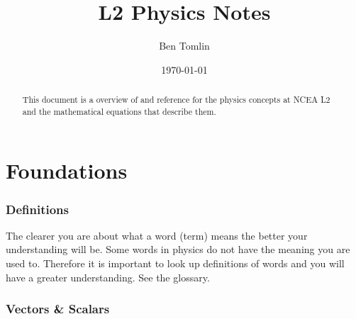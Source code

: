\documentclass[11pt,a4paper]{article}
\date{\today}
\title{L2 Physics Notes}
\author{Ben Tomlin}
\begin{document}
\maketitle

\begin{abstract}
This document is a overview of and reference for the physics concepts at NCEA L2 and the mathematical equations that describe them. 
\end{abstract}


\tableofcontents

\part{Foundations}
\section{Definitions}
The clearer you are about what a word (term) means the better your understanding will be. Some words in physics do not
have the meaning you are used to. Therefore it is important to look up definitions of words and you will have a greater
understanding. See the glossary.

\section{Vectors \& Scalars}

\def\mylsp{1.8}
\newlength\lsp\setlength{\lsp}{\mylsp ex} %
\pgfmathparse{sqrt(\mylsp^2/2)}
\newlength\lspx\setlength{\lspx}{\pgfmathresult ex} %
\newcommand{\vcc}[2]{
	\vcenter{\hbox{\tikz{
				\draw[vec] (0,0) -- (#1:#2);
				\draw[cpt] (0,0) -- (#1:#2 |- 0,0);
				\draw[cpt] (#1:#2|-0,0) -- (#1:#2);
			\draw ($(0,0)!.5!(#1:#2)+({mod(#1+360+90,360)<180?-\lspx:\lspx},{mod(#1+360,360)<180?\lspx:-\lspx})$) node{$V$};
			\draw ($(0,0)!.5!(#1:#2|-0,0) + (0,{mod(#1+360,360)>180?\lsp:-\lsp})$) node{$V_x$};
			\draw ($(#1:#2)!.5!(#1:#2|-0,0)+ ({mod(#1+360+90,360)<180?\lsp:-\lsp},0)$) node {$V_y$};
			}
	}}
}

\newcommand{\vcl}[3]{
	\vcenter{\hbox{\begin{tikzpicture}[vec/.style = {very thick, -{Stealth}}]
		\draw[vec] (0,0) -- (#1:#2) ;
		\draw ($(0,0)!0.5!(#1:#2) + ({90+#1}:2ex)$) node{#3};
	\end{tikzpicture}}}
}



\newcommand{\vadd}[4]{\vaddl{#1}{#2}{A}{#3}{#4}{B}}
\newcommand{\vaddl}[6]{ \vaddll{#1}{#2}{#3}{#4}{#5}{#6}{#3+#6} }
\newcommand{\vaddll}[7]{
	\vcenter{\hbox{\tikz[vec/.style ={very thick, -{Stealth}},line join=miter]{
		\draw[vec,blue] (0,0) -- (#1:#2);
		\draw[vec,blue] (#1:#2) -- ++(#4:#5);
		\draw[red,cpt] (0,0) -- ($(#1:#2)+(#4:#5)$) node(R){};
		
		\draw ($(0,0)!0.5!(#1:#2) + ({#1+(#2*sin(#1)+#5*sin(#4)>0?90:-90)}:-\lsp)$) node{#3};
		\draw ($(#1:#2)!0.5!(R) + ({#4+(#2*sin(#1)+#5*sin(#4)>0?90:-90)}:-\lsp)$) node{#6};
		\draw ($(0,0)!0.5!(R) + ({#4+(#2*sin(#1)+#5*sin(#4)>0?-90:90)}:-\lsp)$) node{#7};
	}}}
}
\end{document}
